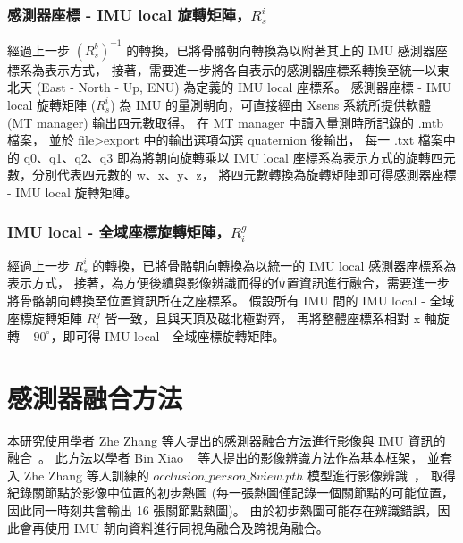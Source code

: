 \subsubsection{感測器座標 - IMU local 旋轉矩陣，$R^i_s$}
經過上一步 $(R^b_s)^{-1}$ 的轉換，已將骨骼朝向轉換為以附著其上的 IMU 感測器座標系為表示方式，
接著，需要進一步將各自表示的感測器座標系轉換至統一以東北天 (East - North - Up, ENU) 為定義的 IMU local 座標系。
感測器座標 - IMU local 旋轉矩陣 ($R^i_s$) 為 IMU 的量測朝向，可直接經由 Xsens 系統所提供軟體 (MT manager) 輸出四元數取得。
在 MT manager 中讀入量測時所記錄的 .mtb 檔案，
並於 file>export 中的輸出選項勾選 quaternion 後輸出，
每一 .txt 檔案中的 q0、q1、q2、q3 即為將朝向旋轉乘以 IMU local 座標系為表示方式的旋轉四元數，分別代表四元數的 w、x、y、z，
將四元數轉換為旋轉矩陣即可得感測器座標 - IMU local 旋轉矩陣。

\subsubsection{IMU local - 全域座標旋轉矩陣，$R^g_i$}
經過上一步 $R^i_s$ 的轉換，已將骨骼朝向轉換為以統一的 IMU local 感測器座標系為表示方式，
接著，為方便後續與影像辨識而得的位置資訊進行融合，需要進一步將骨骼朝向轉換至位置資訊所在之座標系。
假設所有 IMU 間的 IMU local - 全域座標旋轉矩陣 $R^g_i$ 皆一致，且與天頂及磁北極對齊，
再將整體座標系相對 x 軸旋轉 $-90^{\circ}$，即可得 IMU local - 全域座標旋轉矩陣。

\section{感測器融合方法}
本研究使用學者 Zhe Zhang 等人提出的感測器融合方法進行影像與 IMU 資訊的融合~\cite{Zhang_2020_CVPR}。
此方法以學者 Bin Xiao ~\cite{Xiao_2018_ECCV} 等人提出的影像辨識方法作為基本框架，
並套入 Zhe Zhang 等人訓練的 $occlusion\_person\_8view.pth$ 模型進行影像辨識~\cite{zhang2020adafuse}，
取得紀錄關節點於影像中位置的初步熱圖 (每一張熱圖僅記錄一個關節點的可能位置，因此同一時刻共會輸出 16 張關節點熱圖)。
由於初步熱圖可能存在辨識錯誤，因此會再使用 IMU 朝向資料進行同視角融合及跨視角融合。

